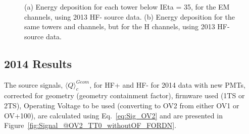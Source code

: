 \begin{figure}[htb]
   \begin{center}
      \caption{(a) Energy deposition for each tower below IEta = 35, for the EM channels,  using 2013 HF- source data.
               (b) Energy deposition for the same towers and channels, but for the H channels, using 2013 HF- source data.}
      \label{fig:HFM_2013_Res}
   \end{center}
\end{figure}

\subsection{2014 Results}
The source signals, ${\langle{Q}\rangle}^{Geom}_{c}$, for HF+ and HF- for 2014 data with new PMTs, corrected for
geometry (geometry containment factor), firmware used (1TS or 2TS), Operating
Voltage to be used (converting to OV2 from either OV1 or OV+100), are calculated
using Eq.~\ref{eq:Sig_OV2} and are presented in Figure~\ref{fig:Signal_@OV2_TT0_withoutOF_FORDN}.


